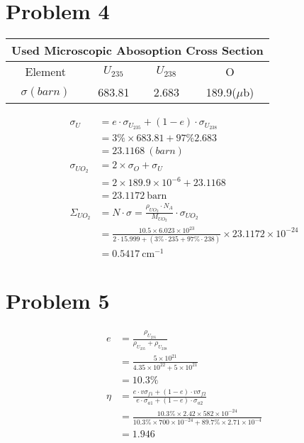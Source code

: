 \documentclass{article}
\begin{document}
\section*{Problem 4}
    \begin{table}[h]
        \centering
        \begin{tabular}{c c c c}
            \multicolumn{4}{c}{Used Microscopic Abosoption Cross Section}\\ \hline \hline
            Element&$U_{235}$ & $U_{238}$& O               \\\hline
            $\sigma(barn)$ & 683.81&   2.683&189.9($\mu$b)                         \\ \hline
        \end{tabular}
    \end{table}
    \begin{align*}
        \sigma_U    &= e\cdot \sigma_{U_{235}}+(1-e)\cdot \sigma_{U_{238}} \\
                    &=3\% \times 683.81+97\% 2.683\\
                    &=23.1168\  (barn)                                                  \\
        \sigma_{UO_2}&=2\times \sigma_O + \sigma_U\\\
                    &= 2\times 189.9\times 10^{-6}+ 23.1168\\
                    &=23.1172\ \text{barn}\\
        \Sigma_{UO_2}&=N \cdot \sigma = \frac{\rho_{UO_2} \cdot N_A}{M_{UO_2}}\cdot \sigma_{UO_2}\\
                    &=\frac{10.5\times 6.023\times 10^{23}}{2\cdot15.999+(3\%\cdot 235+97\%\cdot 238)}\times 23.1172\times 10^{-24}\\
                    &=0.5417\ \text{cm}^{-1}
    \end{align*}
\section*{Problem 5}
    \begin{align*}
        e&=\frac {\rho_{U_{235}}}{\rho_{U_{235}}+\rho_{U_{238}}}  \\
            &= \frac{5\times 10^{21}}{4.35\times 10^{22}+5\times 10^{21}}\\
            &=10.3\%                                                     \\
        \eta &= \frac{e\cdot v \sigma_{f1}+(1-e)\cdot v \sigma_{f2}}{e\cdot \sigma_{a1}+(1-e)\cdot \sigma_{a2}}\\
            &=\frac {10.3\% \times2.42\times 582 \times 10^{-24}}{10.3\% \times 700 \times 10^{-24}+89.7\%\times 2.71\times 10^{-4}}\\
            &=1.946
    \end{align*}
\newpage
\end{document}
